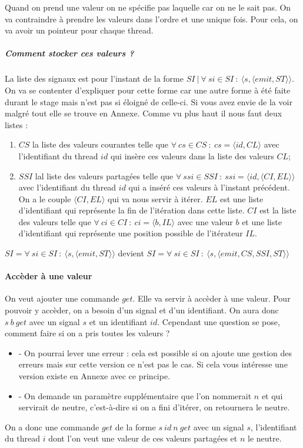 \documentclass[10pt,a4paper]{article}
\begin{document}
					Quand on prend une valeur on ne spécifie pas laquelle car on ne le sait pas. On va contraindre à prendre les valeurs dans l'ordre et une unique fois. Pour cela, on va avoir un pointeur pour chaque thread. 
					
					\subparagraph{Comment stocker ces valeurs ?} 
					La liste des signaux est pour l'instant de la forme $SI~|~\forall~si \in SI~:~\langle s,\langle emit,ST \rangle\rangle$. On va se contenter d'expliquer pour cette forme car une autre forme à été faite durant le stage mais n'est pas si éloigné de celle-ci. Si vous avez envie de la voir malgré tout elle se trouve en Annexe. Comme vu plus haut il nous faut deux listes : 
					\smallbreak
					\begin{enumerate}
						\item $CS$ la liste des valeurs courantes telle que $\forall~cs \in CS~:~cs = \langle id , CL \rangle$ avec l'identifiant du thread $id$ qui insère ces valeurs dans la liste des valeurs $CL$;
						\item $SSI$ lal liste des valeurs partagées telle que $\forall~ssi \in SSI~:~ssi = \langle id,\langle CI,EL\rangle\rangle$ avec l'identifiant du thread $id$ qui a inséré ces valeurs à l'instant précédent. On a le couple $\langle CI,EL\rangle$ qui va nous servir à itérer. $EL$ est une liste d'identifiant qui représente la fin de l'itération dans cette liste. $CI$ est la liste des valeurs telle que $\forall~ci \in CI~:~ci = \langle b,IL\rangle$ avec une valeur $b$ et une liste d'identifiant qui représente une position possible de l'itérateur $IL$.
					\end{enumerate}
					\medbreak
					
					$SI = \forall~si \in SI~:~\langle s,\langle emit,ST \rangle\rangle$ devient $SI = \forall~si \in SI~:~\langle s,\langle emit,CS,SSI,ST \rangle\rangle$
					\bigbreak
					
					
				\paragraph{Accèder à une valeur}
					
					On veut ajouter une commande $get$. Elle va servir à accèder à une valeur. Pour pouvoir y accèder, on a besoin d'un signal et d'un identifiant. On aura donc $s~b~get$ avec un signal $s$ et un identifiant $id$. Cependant une question se pose, comment faire si on a pris toutes les valeurs ? 
					\smallbreak
					\begin{itemize}
						\item[] - On pourrai lever une erreur : cela est possible si on ajoute une gestion des erreurs mais sur cette version ce n'est pas le cas. Si cela vous intéresse une version existe en Annexe avec ce principe.
						\item[] - On demande un paramètre supplémentaire que l'on nommerait $n$  et qui servirait de neutre, c'est-à-dire si on a fini d'itérer, on retournera le neutre.
					\end{itemize} 
					\smallbreak
					On a donc une commande $get$ de la forme $s~id~n~get$ avec un signal $s$, l'identifiant du thread $i$  dont l'on veut une valeur de ces valeurs partagées et $n$ le neutre. 
					\bigbreak
					
\end{document}
